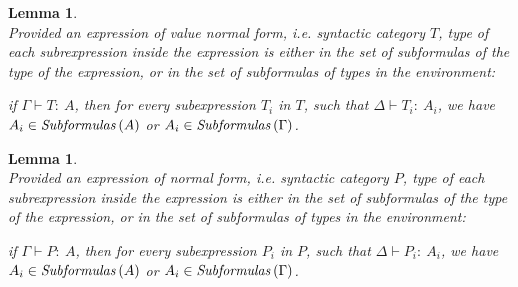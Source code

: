 \documentclass[a4paper]{article}
\newcommand{\typecolor}{}
\newcommand{\termcolor}{}
\newcommand{\tp}[1]{{\typecolor #1}}
\newcommand{\tm}[1]{{\termcolor #1}}
\newtheorem{lemma}[theorem]{Lemma}
\newcommand{\typing}[2]{\tm{#1:\ }\tp{#2}}
\newcommand{\txt}[1]{\text{\textit{#1}}}
\newcommand{\subformulas}[1]{\txt{Subformulas}\,(#1)}
\begin{document}
\begin{lemma}\ \\
\label{sub_V}
Provided an expression of value normal form, i.e. syntactic
category $T$, type of each subrexpression inside the expression is
either in the set of subformulas of the type of the expression, or in
the set of subformulas of types in the environment:

 if $\Gamma \vdash \typing{T}{A}$, then for every subexpression $T_i$
 in $T$, such that $\Delta \vdash \typing{T_i}{A_i}$, we have $A_i \in
 \subformulas{A}$ or $A_i \in \subformulas{\Gamma}$. 
\end{lemma}

\begin{lemma}\ \\
\label{sub_P}
Provided an expression of normal form, i.e. syntactic category $P$,
type of each subrexpression inside the expression is either in the set of
subformulas of the type of the expression, or in the set
of subformulas of types in the environment:

 if $\Gamma \vdash \typing{P}{A}$, then for every subexpression $P_i$
 in $P$, such that $\Delta \vdash \typing{P_i}{A_i}$, we have $A_i \in
 \subformulas{A}$ or $A_i \in \subformulas{\Gamma}$. 
\end{lemma}
 
\end{document}

